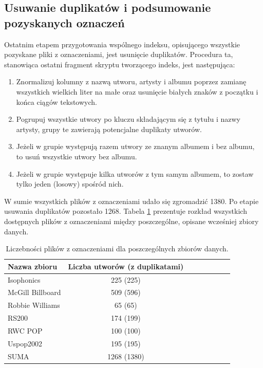 \subsection{Usuwanie duplikatów i podsumowanie pozyskanych oznaczeń}

Ostatnim etapem przygotowania wspólnego indeksu, opisującego wszystkie pozyskane pliki z oznaczeniami, jest usunięcie duplikatów. Procedura ta, stanowiąca ostatni fragment skryptu tworzącego indeks, jest następująca:

\begin{enumerate}
    \item Znormalizuj kolumny z nazwą utworu, artysty i albumu poprzez zamianę wszystkich wielkich
        liter na małe oraz usunięcie białych znaków z początku i końca ciągów tekstowych.
    \item Pogrupuj wszystkie utwory po kluczu składającym się z tytułu i nazwy artysty, grupy te
        zawierają potencjalne duplikaty utworów.
    \item Jeżeli w grupie występują razem utwory ze znanym albumem i bez albumu, to usuń wszystkie
        utwory bez albumu.
    \item Jeżeli w grupie występuje kilka utworów z tym samym albumem, to zostaw tylko jeden
        (losowy) spośród nich.
\end{enumerate}

W sumie wszystkich plików z oznaczeniami udało się zgromadzić 1380. Po etapie usuwania duplikatów pozostało 1268. Tabela \ref{tab:datasets1} prezentuje rozkład wszystkich dostępnych plików z oznaczeniami między poszczególne, opisane wcześniej zbiory danych.

\begin{table}
    \centering
    \caption{Liczebności plików z oznaczeniami dla poszczególnych zbiorów danych.}
    \label{tab:datasets1}
    \begin{tabular}{|l|c|c|c|c|c|c|c|} \hline
        Nazwa zbioru & Liczba utworów (z duplikatami) \\ \hline
        Isophonics & 225 (225) \\
        McGill Billboard & 509 (596) \\
        Robbie Williams & 65 (65) \\
        RS200 & 174 (199) \\
        RWC POP & 100 (100) \\
        Uspop2002 & 195 (195) \\
        SUMA & 1268 (1380) \\ \hline
    \end{tabular}
\end{table}


